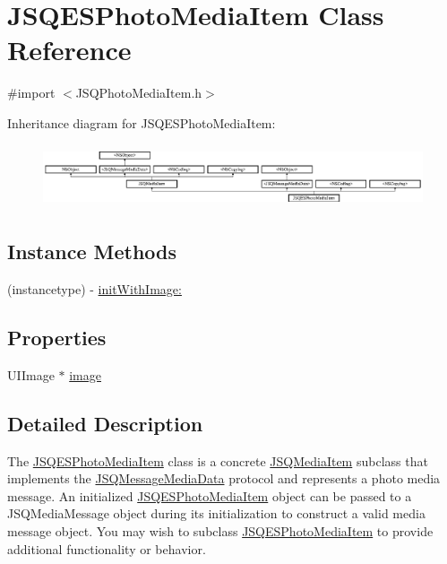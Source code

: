 \hypertarget{interface_j_s_q_e_s_photo_media_item}{}\section{J\+S\+Q\+E\+S\+Photo\+Media\+Item Class Reference}
\label{interface_j_s_q_e_s_photo_media_item}


{\ttfamily \#import $<$J\+S\+Q\+Photo\+Media\+Item.\+h$>$}

Inheritance diagram for J\+S\+Q\+E\+S\+Photo\+Media\+Item\+:\begin{figure}[H]
\begin{center}
\leavevmode
\includegraphics[height=1.871345cm]{interface_j_s_q_e_s_photo_media_item}
\end{center}
\end{figure}
\subsection*{Instance Methods}
\begin{DoxyCompactItemize}
\item 
(instancetype) -\/ \hyperlink{interface_j_s_q_e_s_photo_media_item_adc498cedf696856b61e5fc0fba987c10}{init\+With\+Image\+:}
\end{DoxyCompactItemize}
\subsection*{Properties}
\begin{DoxyCompactItemize}
\item 
U\+I\+Image $\ast$ \hyperlink{interface_j_s_q_e_s_photo_media_item_a1aa9a1511c093d34738602b8332e1529}{image}
\end{DoxyCompactItemize}


\subsection{Detailed Description}
The {\ttfamily \hyperlink{interface_j_s_q_e_s_photo_media_item}{J\+S\+Q\+E\+S\+Photo\+Media\+Item}} class is a concrete {\ttfamily \hyperlink{interface_j_s_q_media_item}{J\+S\+Q\+Media\+Item}} subclass that implements the {\ttfamily \hyperlink{protocol_j_s_q_message_media_data-p}{J\+S\+Q\+Message\+Media\+Data}} protocol and represents a photo media message. An initialized {\ttfamily \hyperlink{interface_j_s_q_e_s_photo_media_item}{J\+S\+Q\+E\+S\+Photo\+Media\+Item}} object can be passed to a {\ttfamily J\+S\+Q\+Media\+Message} object during its initialization to construct a valid media message object. You may wish to subclass {\ttfamily \hyperlink{interface_j_s_q_e_s_photo_media_item}{J\+S\+Q\+E\+S\+Photo\+Media\+Item}} to provide additional functionality or behavior. 

